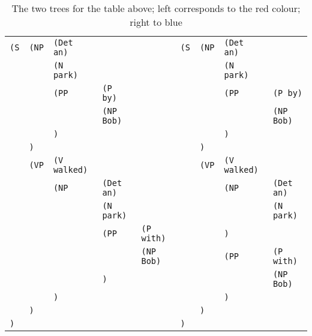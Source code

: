 \documentclass[a4paper]{article}
\begin{document}
\begin{enumerate}
\begin{table}[hb!]
\begin{tabular}{lllll|llll}
\texttt{(S} & \texttt{(NP} & \texttt{(Det an)} & & & \texttt{(S} & \texttt{(NP} & \texttt{(Det an)} & \\
 & & \texttt{(N park)} & & & & & \texttt{(N park)} & \\
 & & \texttt{(PP} & \texttt{(P by)} & & & & \texttt{(PP} & \texttt{(P by)} \\
 & & & \texttt{(NP Bob)} & & & & & \texttt{(NP Bob)} \\
 & & \texttt{)} & & & & & \texttt{)} & \\
 & \texttt{)} & & & & & \texttt{)} & & \\
 & \texttt{(VP} & \texttt{(V walked)} & & & & \texttt{(VP} & \texttt{(V walked)} &\\
 & & \texttt{(NP} & \texttt{(Det an)} & & & & \texttt{(NP} & \texttt{(Det an)} \\
 & & & \texttt{(N park)} & & & & & \texttt{(N park)} \\
 & & & \texttt{(PP} & \texttt{(P with)} & & & \texttt{)} & \\
 & & & & \texttt{(NP Bob)} & & & \texttt{(PP} & \texttt{(P with)} \\
 & & & \texttt{)} & & & & & \texttt{(NP Bob)} \\
 & & \texttt{)} & & & & & \texttt{)} & \\ 
 & \texttt{)} & & & & & \texttt{)} & & \\
\texttt{)} & & & & & \texttt{)} & & & 
\end{tabular}
\caption{The two trees for the table above; left corresponds to the red colour; right to blue}
\end{table}


\end{enumerate}
\end{document}

